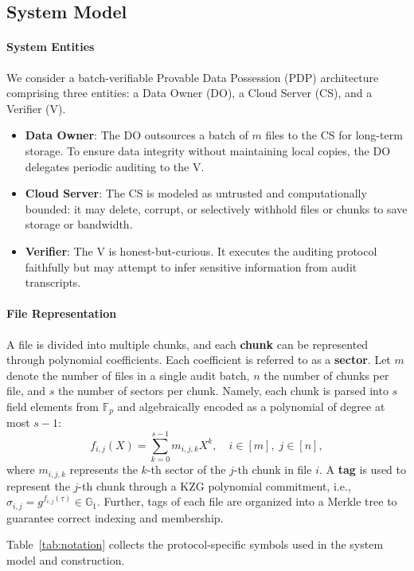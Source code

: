 \documentclass[lettersize,journal]{IEEEtran}
\newcommand{\GG}{\mathbb{G}}
\newcommand{\FF}{\mathbb{F}}
\begin{document}
\subsection{System Model}
\paragraph{System Entities}
We consider a batch-verifiable Provable Data Possession (PDP) architecture comprising three entities: a Data Owner (DO), a Cloud Server (CS), and a Verifier (V).
\begin{itemize}
    \item \textbf{Data Owner}: The DO outsources a batch of $m$ files to the CS for long-term storage. To ensure data integrity without maintaining local copies, the DO delegates periodic auditing to the V.
    \item \textbf{Cloud Server}: The CS is modeled as untrusted and computationally bounded: it may delete, corrupt, or selectively withhold files or chunks to save storage or bandwidth. 
    \item \textbf{Verifier}: The V is honest-but-curious. It executes the auditing protocol faithfully but may attempt to infer sensitive information from audit transcripts.
\end{itemize}

\paragraph{File Representation}
A file is divided into multiple chunks, and each \textbf{chunk} can be represented through polynomial coefficients. Each coefficient is referred to as a \textbf{sector}.
Let $m$ denote the number of files in a single audit batch, $n$ the number of chunks per file, and $s$ the number of sectors per chunk. Namely, each chunk is parsed into $s$ field elements from $\FF_p$ and algebraically encoded as a polynomial of degree at most $s-1$:
$$
    f_{i,j}(X) = \sum_{k=0}^{s-1} m_{i,j,k} X^k, \quad i \in [m], \; j \in [n],
$$
where $m_{i,j,k}$ represents the $k$-th sector of the $j$-th chunk in file $i$. 
A \textbf{tag} is used to represent the \(j\)-th chunk through a KZG polynomial commitment, i.e., $\sigma_{i,j} =  g^{f_{i,j}(\tau)} \in \GG_1$. Further, tags of each file are organized into a Merkle tree to guarantee correct indexing and membership.

Table~\ref{tab:notation} collects the protocol-specific symbols used in the system model and construction.
\end{document}
